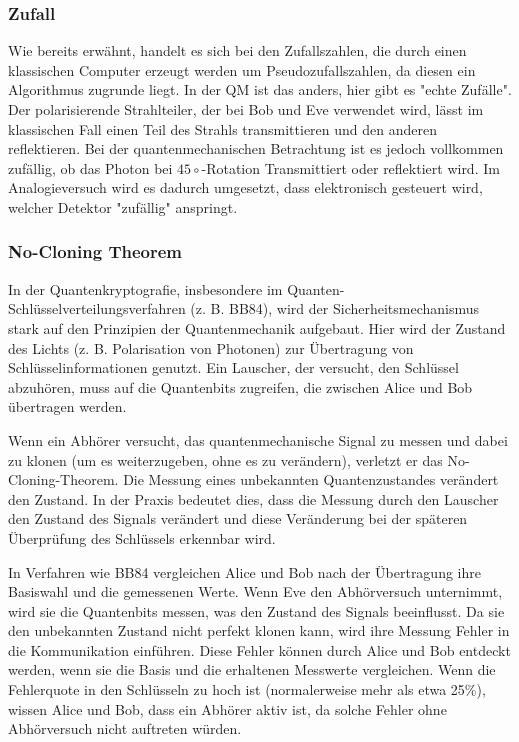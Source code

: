 \subsubsection{Zufall}
Wie bereits erwähnt, handelt es sich bei den Zufallszahlen, die durch einen klassischen Computer erzeugt werden um Pseudozufallszahlen, da diesen ein Algorithmus zugrunde liegt. 
In der QM ist das anders, hier gibt es "echte Zufälle". Der polarisierende Strahlteiler, der bei Bob und Eve verwendet wird, lässt im klassischen Fall einen Teil des Strahls transmittieren und den anderen reflektieren.
Bei der quantenmechanischen Betrachtung ist es jedoch vollkommen zufällig, ob das Photon bei $45\circ$-Rotation Transmittiert oder reflektiert wird. Im Analogieversuch wird es dadurch umgesetzt, dass elektronisch gesteuert wird, welcher Detektor "zufällig" anspringt.

\subsubsection{No-Cloning Theorem}
In der Quantenkryptografie, insbesondere im Quanten-Schlüsselverteilungsverfahren (z. B. BB84), wird der Sicherheitsmechanismus stark auf den Prinzipien der Quantenmechanik aufgebaut. Hier wird der Zustand des Lichts (z. B. Polarisation von Photonen) zur Übertragung von Schlüsselinformationen genutzt. Ein Lauscher, der versucht, den Schlüssel abzuhören, muss auf die Quantenbits zugreifen, die zwischen Alice und Bob übertragen werden.

Wenn ein Abhörer versucht, das quantenmechanische Signal zu messen und dabei zu klonen (um es weiterzugeben, ohne es zu verändern), verletzt er das No-Cloning-Theorem. Die Messung eines unbekannten Quantenzustandes verändert den Zustand. In der Praxis bedeutet dies, dass die Messung durch den Lauscher den Zustand des Signals verändert und diese Veränderung bei der späteren Überprüfung des Schlüssels erkennbar wird.

In Verfahren wie BB84 vergleichen Alice und Bob nach der Übertragung ihre Basiswahl und die gemessenen Werte. Wenn Eve den Abhörversuch unternimmt, wird sie die Quantenbits messen, was den Zustand des Signals beeinflusst. Da sie den unbekannten Zustand nicht perfekt klonen kann, wird ihre Messung Fehler in die Kommunikation einführen. Diese Fehler können durch Alice und Bob entdeckt werden, wenn sie die Basis und die erhaltenen Messwerte vergleichen. 
Wenn die Fehlerquote in den Schlüsseln zu hoch ist (normalerweise mehr als etwa 25\%), wissen Alice und Bob, dass ein Abhörer aktiv ist, da solche Fehler ohne Abhörversuch nicht auftreten würden.

